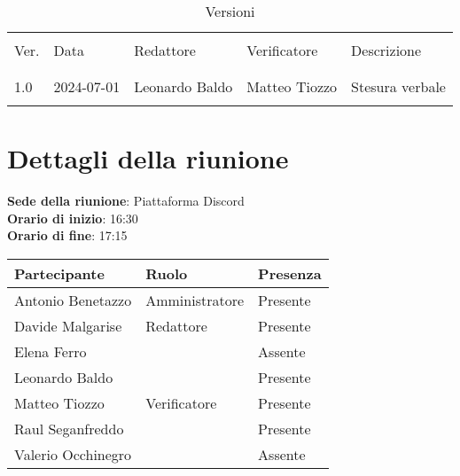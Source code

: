 \documentclass[italian,12pt]{article}
\begin{document}
\newcommand{\mySkip}[1][]{#1}



\newpage



\begin{table}[!h]
	\caption{Versioni}
	\footnotesize
	\begin{center}
		\begin{tabular}{ l l l l p{6cm} }
			\hline                                                                      \\[-2ex]
			Ver. & Data       & Redattore        & Verificatore       & Descrizione     \\
			\\[-2ex] \hline \\[-1.5ex]
			1.0  & 2024-07-01 & Leonardo Baldo   & Matteo Tiozzo      & Stesura verbale \\
			\\[-1.5ex] \hline
		\end{tabular}
	\end{center}
\end{table}

\newpage

\tableofcontents

\newpage

\section{Dettagli della riunione}

\textbf{Sede della riunione}: Piattaforma Discord\\
\textbf{Orario di inizio}: 16:30\\
\textbf{Orario di fine}: 17:15\\

\begin{flushleft}
	\begin{table}[!h]
		\begin{tabular}{ |l|l|l| }
			\hline
			\textbf{Partecipante} & \textbf{Ruolo} & \textbf{Presenza} \\
			\hline
			Antonio Benetazzo     & Amministratore & Presente          \\
			Davide Malgarise      & Redattore      & Presente          \\
			Elena Ferro           &                & Assente           \\
			Leonardo Baldo        &                & Presente          \\
			Matteo Tiozzo         & Verificatore   & Presente          \\
			Raul Seganfreddo      &                & Presente          \\
			Valerio Occhinegro    &                & Assente           \\
			\hline
		\end{tabular}
	\end{table}
\end{flushleft}
\end{document}

